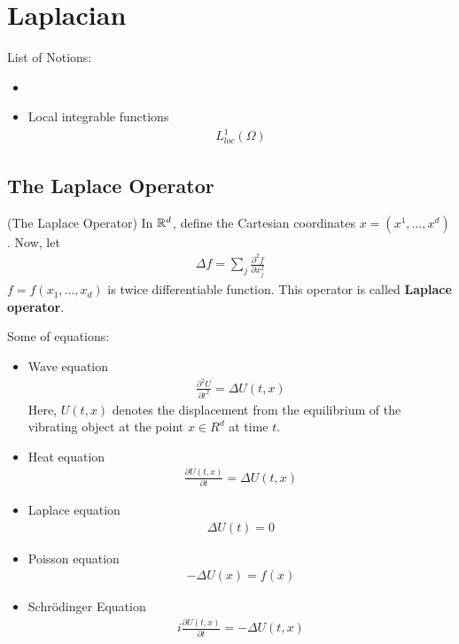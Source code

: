 \documentclass[Total.tex]{subfiles}
\begin{document}
	\chapter{Laplacian}
		List of Notions:
		\begin{itemize}
			\item 
			\item Local integrable functions
			\begin{gather*}
				L_{loc}^1(\Omega)
			\end{gather*}
		\end{itemize}
		\section{The Laplace Operator}
			\begin{Def}
				(The Laplace Operator) In $\mathbb{R}^d$, define the Cartesian coordinates $x=(x^1,\dots,x^d)$. Now, let
				\begin{gather*}
					\Delta f=\sum_j \frac{\partial^2 f}{\partial x_j^2}
				\end{gather*}
				$f=f(x_1,\dots,x_d)$ is twice differentiable function. This operator is called \textbf{Laplace operator}.
			\end{Def}
			Some of equations:
			\begin{itemize}
				\item Wave equation
				\begin{gather*}
					\frac{\partial^2 U}{\partial t^2}=\Delta U(t,x)
				\end{gather*}
				Here, $U(t,x)$ denotes the displacement from the equilibrium of the vibrating object at the point $x\in R^d$ at time $t$.
				\item Heat equation
				\begin{gather*}
					\frac{\partial U(t,x)}{\partial t}=\Delta U(t,x)
				\end{gather*}
				\item Laplace equation
				\begin{gather*}
					\Delta U(t)=0
				\end{gather*}
				\item Poisson equation
				\begin{gather*}
					-\Delta U(x)=f(x)
				\end{gather*}
				\item Schrödinger Equation
				\begin{gather*}
					i\frac{\partial U(t,x)}{\partial t}=-\Delta U(t,x)
				\end{gather*}
			\end{itemize}
\end{document}
